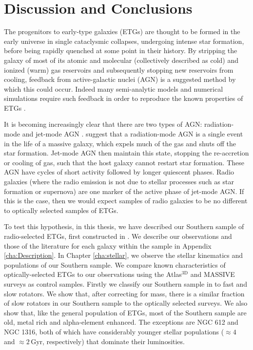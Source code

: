 \chapter{Discussion and Conclusions}
	\label{cha:conclusion}
The progenitors to early-type galaxies (ETGs) are thought to be formed in the early universe in single cataclysmic collapses, undergoing intense star formation, before being rapidly quenched at some point in their history. By stripping the galaxy of most of its atomic and molecular (collectively described as cold) and ionized (warm) gas reservoirs and subsequently stopping new reservoirs from cooling, feedback from active-galactic nuclei (AGN) is a suggested method by which this could occur. Indeed many semi-analytic models and numerical simulations require such feedback in order to reproduce the known properties of ETGs \citep[e.g.][]{Kauffmann2000, DiMatteo2005, Springel2005, Bower2006}. 

It is becoming increasingly clear that there are two types of AGN: radiation-mode and jet-mode AGN \citep[e.g.][]{Antonucci2012}. \citet{Heckman2014} suggest that a radiation-mode AGN is a single event in the life of a massive galaxy, which expels much of the gas and shuts off the star formation. Jet-mode AGN then maintain this state, stopping the re-accretion or cooling of gas, such that the host galaxy cannot restart star formation. These AGN have cycles of short activity followed by longer quiescent phases. Radio galaxies (where the radio emission is not due to stellar processes such as star formation or supernova) are one marker of the active phase of jet-mode AGN. If this is the case, then we would expect samples of radio galaxies to be no different to optically selected samples of ETGs. 

To test this hypothesis, in this thesis, we have described our Southern sample of radio-selected ETGs, first constructed in \citet{Prandoni2010}. We describe our observations and those of the literature for each galaxy within the sample in Appendix \ref{cha:Description}. In Chapter \ref{cha:stellar}, we observe the stellar kinematics and populations of our Southern sample. We compare known characteristics of optically-selected ETGs to our observations using the Atlas$^\text{3D}$ and MASSIVE surveys as control samples. Firstly we classify our Southern sample in to fast and slow rotators. We show that, after correcting for mass, there is a similar fraction of slow rotators in our Southern sample to the optically selected surveys. We also show that, like the general population of ETGs, most of the Southern sample are old, metal rich and alpha-element enhanced. The exceptions are NGC 612 and NGC 1316, both of which have considerably younger stellar populations ($\approx 4$ and $\approx 2$\,Gyr, respectively) that dominate their luminosities. 

